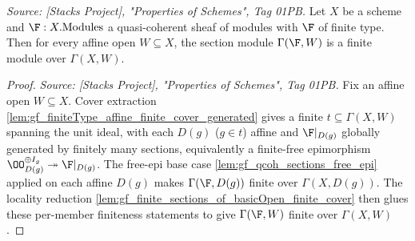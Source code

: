 \begin{lemma}
  \label{lem:gf_qcoh_fintype_finite_sections}
  \textit{Source: [Stacks Project], "Properties of Schemes", Tag 01PB.}
  Let \(X\) be a scheme and \(\F : X.\mathrm{Modules}\) a quasi-coherent sheaf of
  modules with \(\F\) of finite type. Then for every affine open \(W \subseteq X\), the
  section module \(\Gamma(\F, W)\) is a finite module over \(\Gamma(X, W)\).
\end{lemma}

\begin{proof}
        \leanok
  \textit{Source: [Stacks Project], "Properties of Schemes", Tag 01PB.}
  Fix an affine open \(W \subseteq X\). Cover extraction
  \cref{lem:gf_finiteType_affine_finite_cover_generated} gives a finite
  \(t \subseteq \Gamma(X, W)\) spanning the unit ideal, with each \(D(g)\) (\(g \in t\))
  affine and \(\F|_{D(g)}\) globally generated by finitely many sections, equivalently a
  finite-free epimorphism \(\OO_{D(g)}^{\oplus I_g} \twoheadrightarrow \F|_{D(g)}\). The
  free-epi base case \cref{lem:gf_qcoh_sections_free_epi} applied on each affine \(D(g)\)
  makes \(\Gamma(\F, D(g))\) finite over \(\Gamma(X, D(g))\). The locality reduction
  \cref{lem:gf_finite_sections_of_basicOpen_finite_cover} then glues these per-member
  finiteness statements to give \(\Gamma(\F, W)\) finite over \(\Gamma(X, W)\).
\end{proof}

